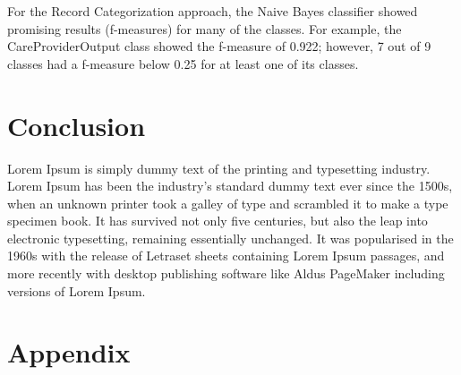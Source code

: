 \documentclass[11pt, notitlepage,abstracton,oneside]{article}   	%
\begin{document}
For the Record Categorization approach, the Naive Bayes classifier showed promising results (f-measures) for many of the classes. For example, the CareProviderOutput class showed the f-measure of 0.922; however, 7 out of 9 classes had a f-measure below 0.25 for at least one of its classes.

\section{Conclusion}
Lorem Ipsum is simply dummy text of the printing and typesetting industry. Lorem Ipsum has been the industry's standard dummy text ever since the 1500s, when an unknown printer took a galley of type and scrambled it to make a type specimen book. It has survived not only five centuries, but also the leap into electronic typesetting, remaining essentially unchanged. It was popularised in the 1960s with the release of Letraset sheets containing Lorem Ipsum passages, and more recently with desktop publishing software like Aldus PageMaker including versions of Lorem Ipsum.

\section{Appendix}
\end{document}
